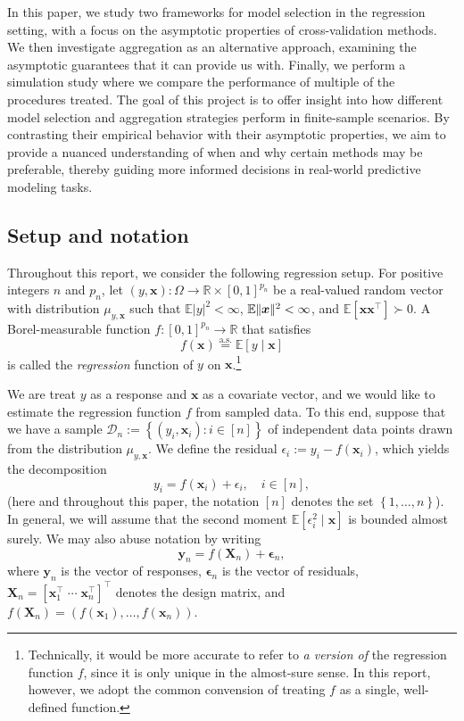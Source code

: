 \documentclass[11pt, letter paper]{article}
\newcommand{\1}{\mathmybb{1}}
\newcommand{\R}{\mathbb{R}}
\newcommand{\0}{\emptyset}
\newcommand{\E}{\mathbb{E}}
\newcommand{\Ep}[1]{\mathbb{E}\left[ #1 \right]}
\newcommand{\paren}[1]{\left(#1 \right)}
\newcommand{\set}[1]{\left\{ #1 \right\}}
\newcommand{\norm}[1]{|\hspace{-1pt}|#1 |\hspace{-1pt}|}
\newcommand{\normsq}[1]{\norm{#1}^{2}}
\newcommand{\data}{\mathcal{D}_{n}}
\newcommand{\aseq}{\stackrel{\mathrm{a.s.}}{=}}
\newcommand{\X}{\boldsymbol{X}}
\newcommand{\x}{\boldsymbol{x}}
\newcommand{\y}{\boldsymbol{y}}
\newcommand{\bepsilon}{\boldsymbol{\epsilon}}
\begin{document}
In this paper, we study two frameworks for model selection in the regression setting, with a focus on the asymptotic properties of cross-validation methods. We then investigate aggregation as an alternative approach, examining the asymptotic guarantees that it can provide us with. Finally, we perform a simulation study where we compare the performance of multiple of the procedures treated. The goal of this project is to offer insight into how different model selection and aggregation strategies perform in finite-sample scenarios. By contrasting their empirical behavior with their asymptotic properties, we aim to provide a nuanced understanding of when and why certain methods may be preferable, thereby guiding more informed decisions in real-world predictive modeling tasks.

\subsection{Setup and notation}\label{sec:setup}

Throughout this report, we consider the following regression setup. For positive integers \(n\) and \(p_{n}\), let \((y, \x):\Omega\to\R\times{[0,1]}^{p_{n}}\) be a real-valued random vector with distribution \(\mu_{y, \x}\) such that \(\E{|y|^{2}}<\infty\), \(\E\normsq{\x}<\infty\), and \(\Ep{\x\x^{\top}}\succ 0\). A Borel-measurable function \(f:{[0,1]}^{p_{n}} \to \R\) that satisfies
\begin{equation}\label{eq:setup}
    f(\x) \aseq \Ep{y\mid \x}
\end{equation}
is called the \emph{regression} function of \(y\) on \(\x\).\footnote{Technically, it would be more accurate to refer to \emph{a version of} the regression function \(f\), since it is only unique in the almost-sure sense. In this report, however, we adopt the common convension of treating \(f\) as a single, well-defined function.}

We are treat \(y\) as a response and \(\x\) as a covariate vector, and we would like to estimate the regression function \(f\) from sampled data. To this end, suppose that we have a sample \(\data := \set{\paren{y_{i}, \x_{i}}:i\in [n]}\) of independent data points drawn from the distribution \(\mu_{y, \x}\). We define the residual \(\epsilon_{i}:= y_{i} - f(\x_{i})\), which yields the decomposition
\[y_{i} = f(\x_{i}) + \epsilon_{i}, \quad i\in[n],\]
(here and throughout this paper, the notation \([n]\) denotes the set \(\set{1, \ldots, n}\)).
In general, we will assume that the second moment \(\Ep{\epsilon^{2}_{i}\mid\x}\) is bounded almost surely. We may also abuse notation by writing
\[\y_{n} = f(\X_{n}) + \bepsilon_{n},\]
where  \(\y_{n}\) is the vector of responses, \(\bepsilon_{n}\) is the vector of residuals, \(\X_{n} = {[\x_{1}^{\top}\;\cdots\;\x_{n}^{\top}]}^{\top}\) denotes the design matrix, and \(f(\X_{n}) = (f(\x_{1}),\ldots,f(\x_{n}))\).
\end{document}
